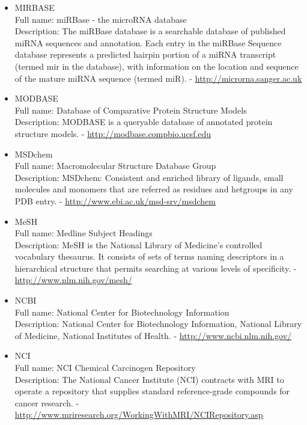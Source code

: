 \begin{itemize}
\item{MIRBASE}\\ Full name: miRBase - the microRNA database\\ Description: The miRBase database is a searchable database of published miRNA sequences and annotation. Each entry in the miRBase Sequence database represents a predicted hairpin portion of a miRNA transcript (termed mir in the database), with information on the location and sequence of the mature miRNA sequence (termed miR). - 
\url{http://microrna.sanger.ac.uk}

\item{MODBASE}\\ Full name: Database of Comparative Protein Structure Models\\ Description: MODBASE is a queryable database of annotated protein structure models. - 
\url{http://modbase.compbio.ucsf.edu}

\item{MSDchem}\\ Full name: Macromolecular Structure Database Group\\ Description: MSDchem: Consistent and enriched library of ligands, small molecules and monomers that are referred as residues and hetgroups in any PDB entry. - 
\url{http://www.ebi.ac.uk/msd-srv/msdchem}

\item{MeSH}\\ Full name: Medline Subject Headings\\ Description: MeSH is the National Library of Medicine's controlled vocabulary thesaurus. It consists of sets of terms naming descriptors in a hierarchical structure that permits searching at various levels of specificity. - 
\url{http://www.nlm.nih.gov/mesh/}

\item{NCBI}\\ Full name: National Center for Biotechnology Information\\ Description: National Center for Biotechnology Information, National Library of Medicine, National Institutes of Health. - 
\url{http://www.ncbi.nlm.nih.gov/}

\item{NCI}\\ Full name: NCI Chemical Carcinogen Repository\\ Description: The National Cancer Institute (NCI) contracts with MRI to operate a repository that supplies standard reference-grade compounds for cancer research. - 
\url{http://www.mriresearch.org/WorkingWithMRI/NCIRepository.asp}


\end{itemize}
